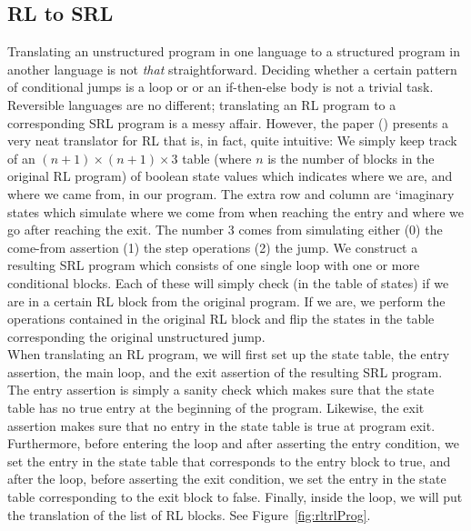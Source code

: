 \subsection{RL to SRL}

Translating an unstructured program in one language to a structured program in another language is not \textit{that} straightforward. Deciding whether a certain pattern of conditional jumps is a loop or or an if-then-else body is not a trivial task. Reversible languages are no different; translating an RL program to a corresponding SRL program is a messy affair. However, the paper (\cite[p.~107]{REV}) presents a very neat translator for RL that is, in fact, quite intuitive: We simply keep track of an $(n+1) \times (n+1) \times 3$ table (where $n$ is the number of blocks in the original RL program) of boolean state values which indicates where we are, and where we came from, in our program. The extra row and column are `imaginary states which simulate where we come from when reaching the entry and where we go after reaching the exit. The number $3$ comes from simulating either (0) the come-from assertion (1) the step operations (2) the jump. We construct a resulting SRL program which consists of one single loop with one or more conditional blocks. Each of these will simply check (in the table of states) if we are in a certain RL block from the original program. If we are, we perform the operations contained in the original RL block and flip the states in the table corresponding the original unstructured jump.\\

\noindent When translating an RL program, we will first set up the state table, the entry assertion, the main loop, and the exit assertion of the resulting SRL program. The entry assertion is simply a sanity check which makes sure that the state table has no true entry at the beginning of the program. Likewise, the exit assertion makes sure that no entry in the state table is true at program exit. Furthermore, before entering the loop and after asserting the entry condition, we set the entry in the state table that corresponds to the entry block to true, and after the loop, before asserting the exit condition, we set the entry in the state table corresponding to the exit block to false. Finally, inside the loop, we will put the translation of the list of RL blocks. See Figure~\ref{fig:rltrlProg}.\\

